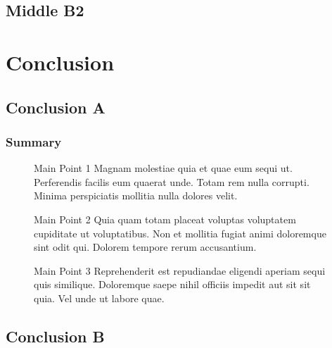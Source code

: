 \documentclass[12pt,presentation,notes]{beamer}
\begin{document}
\subsection{Middle B2}
\section{Conclusion}
\subsection{Conclusion A}

\begin{frame}
\frametitle{Summary}

\begin{figure}[HT]

\begin{block}{Main Point 1}
	Magnam molestiae quia et quae eum sequi ut. Perferendis facilis eum quaerat unde. Totam rem nulla corrupti. Minima perspiciatis mollitia nulla dolores velit.
\end{block}
\begin{block}{Main Point 2}
Quia quam totam placeat voluptas voluptatem cupiditate ut voluptatibus. Non et mollitia fugiat animi doloremque sint odit qui. Dolorem tempore rerum accusantium.
\end{block}
\begin{block}{Main Point 3}
Reprehenderit est repudiandae eligendi aperiam sequi quis similique. Doloremque saepe nihil officiis impedit aut sit sit quia. Vel unde ut labore quae.
\end{block}
\end{figure}

\end{frame}


\subsection{Conclusion B}
\end{document}
